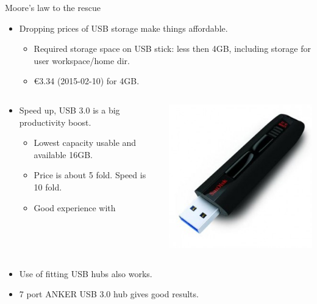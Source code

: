 \begin{frame}{Moore's law to the rescue}
  
  \begin{itemize}
  \item Dropping prices of USB storage make things affordable.
    \begin{itemize}
    \item Required storage space on USB stick: less then 4GB,
      including storage for user workspace/home dir.
    \item \euro 3.34 (2015-02-10) for 4GB.
    \end{itemize}
  \end{itemize}
  \begin{columns}
    \begin{column}{.65\textwidth}
      \begin{itemize}
      \item Speed up, USB 3.0 is a big productivity boost.
        \begin{itemize}
        \item Lowest capacity usable and available 16GB.
        \item Price is about 5 fold. Speed is 10 fold.
        \item Good experience with 
        \end{itemize}
      \end{itemize}
    \end{column}
    \begin{column}{.35\textwidth}
      \includegraphics[width=\textwidth]{figures/SDCZ80-300x300.jpg}
    \end{column}
  \end{columns}
  \begin{itemize}
  \item Use of fitting USB hubs also works.
  \item 7 port ANKER USB 3.0 hub gives good results. 
  \end{itemize}
\end{frame}

